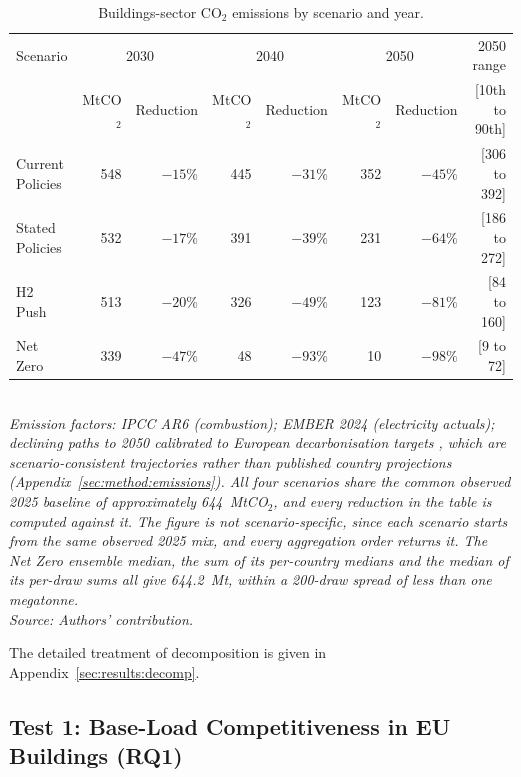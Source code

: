 \begin{table}[H]
    \centering
    \caption{Buildings-sector CO$_2$ emissions by scenario and year.}
    \label{tab:co2}
    \footnotesize
    \setlength{\tabcolsep}{4pt}
\begin{tabular}{lrrrrrrr}
        \toprule
        Scenario & \multicolumn{2}{c}{2030} & \multicolumn{2}{c}{2040} & \multicolumn{2}{c}{2050} & 2050 range \\
         & MtCO$_2$ & Reduction & MtCO$_2$ & Reduction & MtCO$_2$ & Reduction & [10th to 90th] \\
        \midrule
        Current Policies & 548 & $-15\%$ & 445 & $-31\%$ & 352 & $-45\%$ & [306 to 392] \\
        Stated Policies  & 532 & $-17\%$ & 391 & $-39\%$ & 231 & $-64\%$ & [186 to 272] \\
        H2 Push          & 513 & $-20\%$ & 326 & $-49\%$ & 123 & $-81\%$ & [84 to 160] \\
        Net Zero         & 339 & $-47\%$ & ~48 & $-93\%$ & ~10 & $-98\%$ & [9 to 72] \\
        \bottomrule
    \end{tabular}\\[8pt]
    \footnotesize{\textit{Emission factors: IPCC AR6 (combustion); EMBER 2024
    (electricity actuals); declining paths to 2050 calibrated to European decarbonisation
targets \citep{EEA2023fit55}, which are scenario-consistent trajectories rather than
published country projections (Appendix~\ref{sec:method:emissions}). All four scenarios
    share the common observed 2025 baseline of approximately 644~MtCO$_2$, and every
    reduction in the table is computed against it. The figure is not scenario-specific, since each scenario starts from the same observed 2025 mix, and every aggregation order returns it. The Net Zero ensemble median, the sum of its per-country medians and the median of its per-draw sums all give 644.2~Mt, within a 200-draw spread of less than one megatonne.}}
    \\[2pt]{\footnotesize\textit{Source: Authors' contribution.}}
\end{table}

\noindent The detailed treatment of decomposition is given in Appendix~\ref{sec:results:decomp}.

\subsection{Test 1: Base-Load Competitiveness in EU Buildings (RQ1)}
\label{sec:results:h2conditions}


